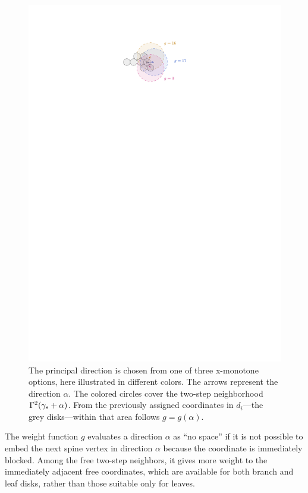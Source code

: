 \begin{figure}
    \centering
    \includegraphics{graphics/ch5_principaldirection.pdf}
    \caption{The principal direction is chosen from one of three x-monotone options, here illustrated in different colors. The arrows represent the direction $\alpha$. The colored circles cover the two-step neighborhood $\Gamma^2(\gamma_s + \alpha)$. From the previously assigned coordinates in $d_i$---the grey disks---within that area follows $g = g(\alpha)$.}
    \label{fig:ch5-principaldirection}
\end{figure}

The weight function $g$ evaluates a direction $\alpha$ as ``no space'' if it is not possible to embed the next spine vertex in direction $\alpha$ because the coordinate is immediately blocked.
Among the free two-step neighbors, it gives more weight to the immediately adjacent free coordinates, which are available for both branch and leaf disks, rather than those suitable only for leaves.

